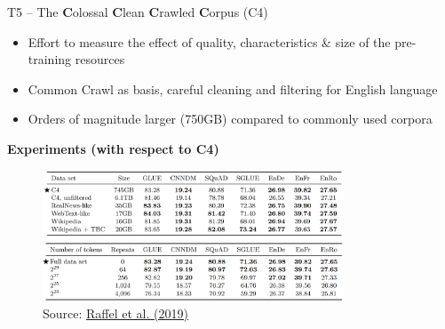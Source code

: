 \documentclass[]{beamer}
\begin{document}
\begin{frame}{T5 -- The \textbf{C}olossal \textbf{C}lean \textbf{C}rawled \textbf{C}orpus (C4)}
\small
	\begin{itemize}
		\item Effort to measure the effect of quality, characteristics \& size of the pre-training resources
		\item Common Crawl as basis, careful cleaning and filtering for English language
		\item Orders of magnitude larger (750GB) compared to commonly used corpora 
	\end{itemize}

	\vspace{.3cm}
	
	\textbf{Experiments (with respect to C4)}
	
	\begin{figure}
		\centering
		\includegraphics[width = 9cm]{figure/c4-characteristics.png}\\ 
		\includegraphics[width = 9cm]{figure/c4-size.png}\\ 
		\footnotesize{Source:} \href{https://arxiv.org/pdf/1910.10683.pdf}{\footnotesize Raffel et al. (2019)}
	\end{figure}
\end{frame}
\end{document}

